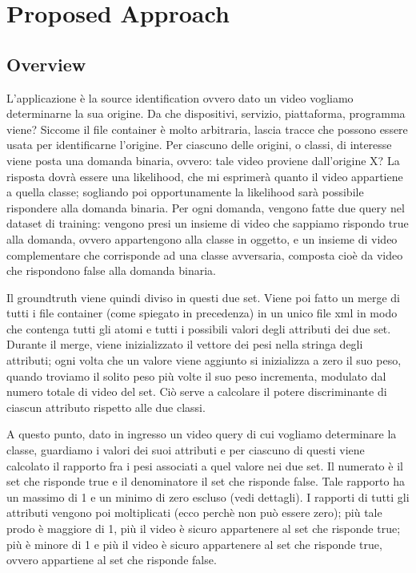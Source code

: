 \chapter{Proposed Approach}

\section{Overview}

L'applicazione è la source identification ovvero dato un video vogliamo determinarne la sua origine. Da che dispositivi, servizio, piattaforma, programma viene? Siccome il file container è molto arbitraria, lascia tracce che possono essere usata per identificarne l'origine.
Per ciascuno delle origini, o classi, di interesse viene posta una domanda binaria, ovvero: tale video proviene dall'origine X? La risposta dovrà essere una likelihood, che mi esprimerà quanto il video appartiene a quella classe; sogliando poi opportunamente la likelihood sarà possibile rispondere alla domanda binaria.
Per ogni domanda, vengono fatte due query nel dataset di training: vengono presi un insieme di video che sappiamo rispondo true alla domanda, ovvero appartengono alla classe in oggetto, e un insieme di video complementare che corrisponde ad una classe avversaria, composta cioè da video che rispondono false alla domanda binaria.

Il groundtruth viene quindi diviso in questi due set. Viene poi fatto un merge di tutti i file container (come spiegato in precedenza) in un unico file xml in modo che contenga tutti gli atomi e tutti i possibili valori degli attributi dei due set. Durante il merge, viene inizializzato il vettore dei pesi nella stringa degli attributi; ogni volta che un valore viene aggiunto si inizializza a zero il suo peso, quando troviamo il solito peso più volte il suo peso incrementa, modulato dal numero totale di video del set. Ciò serve a calcolare il potere discriminante di ciascun attributo rispetto alle due classi.

A questo punto, dato in ingresso un video query di cui vogliamo determinare la classe, guardiamo i valori dei suoi attributi e per ciascuno di questi viene calcolato il rapporto fra i pesi associati a quel valore nei due set. Il numerato è il set che risponde true e il denominatore il set che risponde false. Tale rapporto ha un massimo di 1 e un minimo di zero escluso (vedi dettagli). I rapporti di tutti gli attributi vengono poi moltiplicati (ecco perchè non può essere zero); più tale prodo è maggiore di 1, più il video è sicuro appartenere al set che risponde true; più è minore di 1 e più il video è sicuro appartenere al set che risponde true, ovvero appartiene al set che risponde false.


